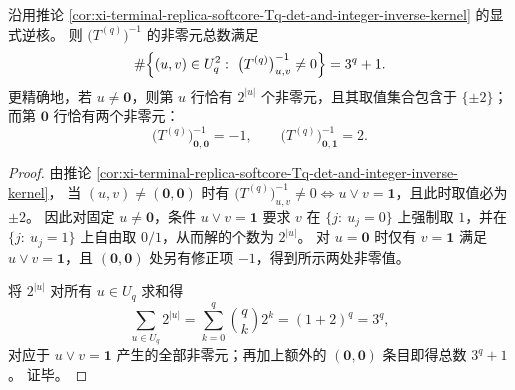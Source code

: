 \begin{corollary}\label{cor:xi-terminal-replica-softcore-inverse-support-count}
沿用推论 \ref{cor:xi-terminal-replica-softcore-Tq-det-and-integer-inverse-kernel} 的显式逆核。
则 \(\bigl(T^{(q)}\bigr)^{-1}\) 的非零元总数满足
\[
\#\Bigl\{(u,v)\in U_q^2:\ \bigl(T^{(q)}\bigr)^{-1}_{u,v}\neq 0\Bigr\}=3^q+1.
\]
更精确地，若 \(u\neq \mathbf{0}\)，则第 \(u\) 行恰有 \(2^{|u|}\) 个非零元，且其取值集合包含于 \(\{\pm 2\}\)；
而第 \(\mathbf{0}\) 行恰有两个非零元：
\[
\bigl(T^{(q)}\bigr)^{-1}_{\mathbf{0},\mathbf{0}}=-1,
\qquad
\bigl(T^{(q)}\bigr)^{-1}_{\mathbf{0},\mathbf{1}}=2.
\]
\end{corollary}
\begin{proof}
由推论 \ref{cor:xi-terminal-replica-softcore-Tq-det-and-integer-inverse-kernel}，
当 \((u,v)\neq(\mathbf{0},\mathbf{0})\) 时有
\(
\bigl(T^{(q)}\bigr)^{-1}_{u,v}\neq 0
\iff
u\vee v=\mathbf{1}
\)，且此时取值必为 \(\pm 2\)。
因此对固定 \(u\neq \mathbf{0}\)，条件 \(u\vee v=\mathbf{1}\) 要求 \(v\) 在 \(\{j:\ u_j=0\}\) 上强制取 \(1\)，并在 \(\{j:\ u_j=1\}\) 上自由取 \(0/1\)，从而解的个数为 \(2^{|u|}\)。
对 \(u=\mathbf{0}\) 时仅有 \(v=\mathbf{1}\) 满足 \(u\vee v=\mathbf{1}\)，且 \((\mathbf{0},\mathbf{0})\) 处另有修正项 \(-1\)，得到所示两处非零值。
\par
将 \(2^{|u|}\) 对所有 \(u\in U_q\) 求和得
\[
\sum_{u\in U_q}2^{|u|}
=\sum_{k=0}^{q}\binom{q}{k}2^{k}
=(1+2)^q
=3^q,
\]
对应于 \(u\vee v=\mathbf{1}\) 产生的全部非零元；再加上额外的 \((\mathbf{0},\mathbf{0})\) 条目即得总数 \(3^q+1\)。
证毕。
\end{proof}

